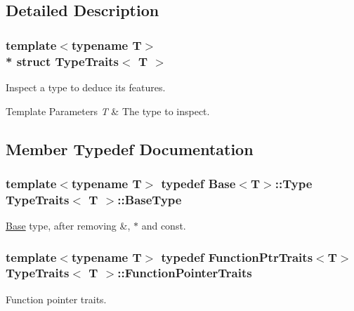 \subsection{Detailed Description}
\subsubsection*{template$<$typename T$>$\\*
struct Type\+Traits$<$ T $>$}

Inspect a type to deduce its features. 
\begin{DoxyTemplParams}{Template Parameters}
{\em T} & The type to inspect. \\
\hline
\end{DoxyTemplParams}


\subsection{Member Typedef Documentation}
\subsubsection[{\texorpdfstring{Base\+Type}{BaseType}}]{\setlength{\rightskip}{0pt plus 5cm}template$<$typename T$>$ typedef {\bf Base}$<$T$>$\+::Type {\bf Type\+Traits}$<$ T $>$\+::{\bf Base\+Type}}\hypertarget{structTypeTraits_a8e315caee6b2541aff4735f3ac18c653}{}\label{structTypeTraits_a8e315caee6b2541aff4735f3ac18c653}
\hyperlink{structTypeTraits_1_1Base}{Base} type, after removing {\ttfamily \&}, {\ttfamily $\ast$} and {\ttfamily const}. 
\subsubsection[{\texorpdfstring{Function\+Pointer\+Traits}{FunctionPointerTraits}}]{\setlength{\rightskip}{0pt plus 5cm}template$<$typename T$>$ typedef {\bf Function\+Ptr\+Traits}$<$T$>$ {\bf Type\+Traits}$<$ T $>$\+::{\bf Function\+Pointer\+Traits}}\hypertarget{structTypeTraits_aa7ce0763f0b1fb8afb7faca47e20646f}{}\label{structTypeTraits_aa7ce0763f0b1fb8afb7faca47e20646f}
Function pointer traits. 
